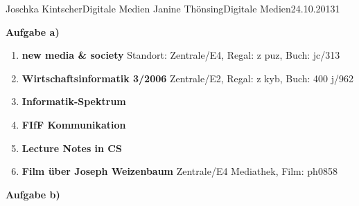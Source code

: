 \documentclass{wa}
\begin{document}
		{Joschka Kintscher}{Digitale Medien}
		{Janine Thönsing}{Digitale Medien}{24.10.2013}{1}


\begin{LARGE}
  \textbf{Aufgabe a)}
\end{LARGE}

\begin{enumerate}
  \item\textbf{new media \& society}
  \newline
  Standort: Zentrale/E4, Regal: z puz, Buch: jc/313
  \newline
  \cite{vergeer2013}

  \item\textbf{Wirtschaftsinformatik 3/2006}
  \newline
  Zentrale/E2, Regal: z kyb, Buch: 400 j/962
  \newline
  \cite{thiesse2006}

  \item\textbf{Informatik-Spektrum}
  \newline
  \cite{lintu2009}

  \item\textbf{FIfF Kommunikation}
  \newline
  \cite{bockerman2013}

  \item\textbf{Lecture Notes in CS}
  \newline
  \cite{temdee2006}
 
  \item\textbf{Film über Joseph Weizenbaum}
  \newline
  Zentrale/E4 Mediathek, Film: ph0858
  \newline
  \cite{haas2006}
  \newline
\end{enumerate}

\begin{LARGE}
  \textbf{Aufgabe b)}
\end{LARGE}



\end{document}
